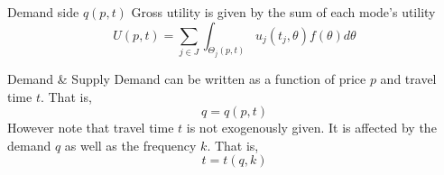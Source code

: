 \documentclass[10pt, aspectratio=169]{beamer}
\begin{document}
\begin{frame}{Demand side $q(p,t)$}
  Gross utility is given by the sum of each mode's utility
  \begin{equation*}
    U(p,t) = \sum_{j\in J} \int_{\Theta_j(p,t)} u_j(t_j,\theta) f(\theta) d\theta
  \end{equation*}
  \begin{block}{Demand \& Supply}
    Demand can be written as a function of price $p$ and travel time $t$. That is,
    \begin{equation*}
      q = q(p,t)
    \end{equation*}
    However note that travel time $t$ is not exogenously given. It is affected by
    the demand $q$ as well as the frequency $k$. That is,
    \begin{equation*}
      t = t(q,k)
    \end{equation*}
  \end{block}

\end{frame}
\end{document}
